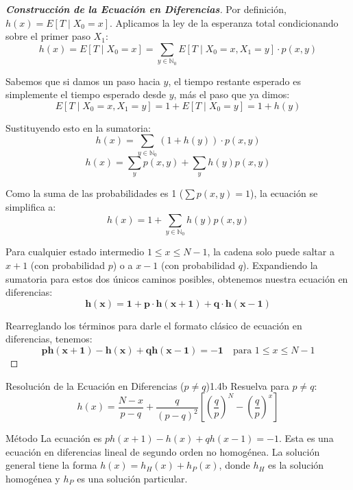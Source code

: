 \documentclass[10pt,a4paper]{article}
\begin{document}
\begin{proof}[\textbf{Construcción de la Ecuación en Diferencias}]
    Por definición, $h(x) = E[T \mid X_0 = x]$. Aplicamos la ley de la esperanza total condicionando sobre el primer paso $X_1$:
    \[ h(x) = E[T \mid X_0 = x] = \sum_{y \in \mathbb{N}_0} E[T \mid X_0 = x, X_1 = y] \cdot p(x, y) \]
    
    Sabemos que si damos un paso hacia $y$, el tiempo restante esperado es simplemente el tiempo esperado desde $y$, más el paso que ya dimos:
    \[ E[T \mid X_0 = x, X_1 = y] = 1 + E[T \mid X_0 = y] = 1 + h(y) \]
    
    Sustituyendo esto en la sumatoria:
    \[ h(x) = \sum_{y \in \mathbb{N}_0} (1 + h(y)) \cdot p(x, y) \]
    \[ h(x) = \sum_{y} p(x,y) + \sum_{y} h(y)p(x,y) \]
    
    Como la suma de las probabilidades es 1 ($\sum p(x,y) = 1$), la ecuación se simplifica a:
    \[ h(x) = 1 + \sum_{y \in \mathbb{N}_0} h(y)p(x, y) \]
    
    Para cualquier estado intermedio $1 \le x \le N-1$, la cadena solo puede saltar a $x+1$ (con probabilidad $p$) o a $x-1$ (con probabilidad $q$). 
    Expandiendo la sumatoria para estos dos únicos caminos posibles, obtenemos nuestra ecuación en diferencias:
    \[ \mathbf{h(x) = 1 + p \cdot h(x+1) + q \cdot h(x-1)} \]
    
    Rearreglando los términos para darle el formato clásico de ecuación en diferencias, tenemos:
    \[ \mathbf{p h(x+1) - h(x) + q h(x-1) = -1} \quad \text{para } 1 \le x \le N-1 \]
\end{proof}

\newpage

\vspace{5mm}

\begin{ejercicio}{Resolución de la Ecuación en Diferencias ($p \neq q$)}{1.4b}
    Resuelva para $p \neq q$:
    \[ h(x) = \frac{N-x}{p-q} + \frac{q}{(p-q)^2} \left[ \left(\frac{q}{p}\right)^N - \left(\frac{q}{p}\right)^x \right] \]
\end{ejercicio}

\vspace{2mm}

\begin{nota}{Método}
    La ecuación es $p h(x+1) - h(x) + q h(x-1) = -1$. 
    Esta es una ecuación en diferencias lineal de segundo orden no homogénea. La solución general tiene la forma $h(x) = h_H(x) + h_P(x)$, 
    donde $h_H$ es la solución homogénea y $h_P$ es una solución particular.
\end{nota}
\end{document}
